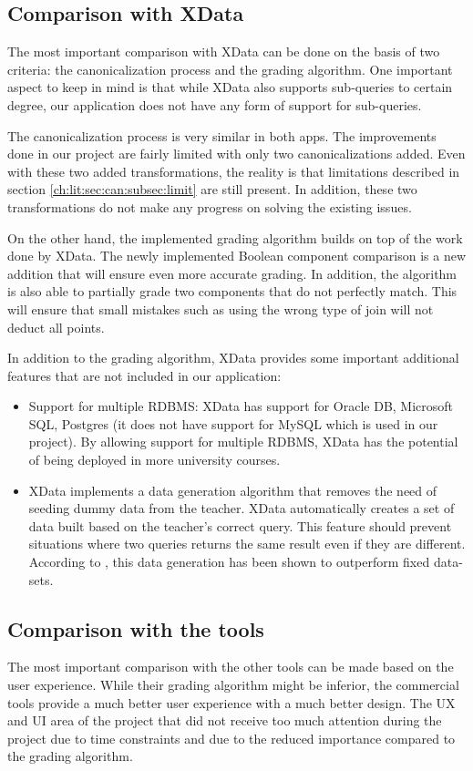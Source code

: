 \subsection{Comparison with XData}

The most important comparison with XData can be done on the basis of two criteria: the canonicalization process and the grading algorithm. One important aspect to keep in mind is that while XData also supports sub-queries to certain degree, our application does not have any form of support for sub-queries.

The canonicalization process is very similar in both apps. The improvements done in our project are fairly limited with only two canonicalizations added. Even with these two added transformations, the reality is that limitations described in section \ref{ch:lit:sec:can:subsec:limit} are still present. In addition, these two transformations do not make any progress on solving the existing issues.

On the other hand, the implemented grading algorithm builds on top of the work done by XData. The newly implemented Boolean component comparison is a new addition that will ensure even more accurate grading. In addition, the algorithm is also able to partially grade two components that do not perfectly match. This will ensure that small mistakes such as using the wrong type of join will not deduct all points.

In addition to the grading algorithm, XData provides some important additional features that are not included in our application:
\begin{itemize}
    \item Support for multiple RDBMS: XData has support for Oracle DB, Microsoft SQL, Postgres (it does not have support for MySQL which is used in our project). By allowing support for multiple RDBMS, XData has the potential of being deployed in more university courses.
    \item XData implements a data generation algorithm that removes the need of seeding dummy data from the teacher. XData automatically creates a set of data built based on the teacher's correct query. This feature should prevent situations where two queries returns the same result even if they are different. According to \cite{lit:xdata_d}, this data generation has been shown to outperform fixed data-sets.
\end{itemize}

\subsection{Comparison with the tools}
The most important comparison with the other tools can be made based on the user experience. While their grading algorithm might be inferior, the commercial tools provide a much better user experience with a much better design. The UX and UI area of the project that did not receive too much attention during the project due to time constraints and due to the reduced importance compared to the grading algorithm.

